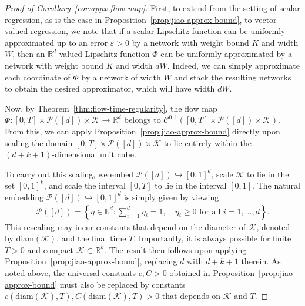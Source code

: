 \documentclass[10pt,a4paper]{amsart}
\newcommand{\R}{\mathbb{R}}
\newcommand{\calC}{{\mathcal C}}
\newcommand{\calK}{{\mathcal K}}
\newcommand{\calP}{{\mathcal P}}
\begin{document}
\begin{proof}[Proof of Corollary~\ref{cor:appx-flow-map}]
First, to extend from the setting of scalar regression, as is the case in Proposition~\ref{prop:jiao-approx-bound}, to vector-valued regression, we note that if a scalar Lipschitz function can be uniformly approximated up to an error $\varepsilon > 0$ by a network with weight bound $K$ and width $W$, then an $\R^d$ valued Lipschitz function $\Phi$ can be uniformly approximated by a network with weight bound $K$ and width $d W$. Indeed, we can simply approximate each coordinate of $\Phi$ by a network of width $W$ and stack the resulting networks to obtain the desired approximator, which will have width $d W$.

Now, by Theorem~\ref{thm:flow-time-regularity}, the flow map $\Phi : [0, T] \times \calP([d]) \times \calK \to \R^d$ belongs to $\calC^{0,1}([0, T] \times \calP([d])\times \calK)$. From this, we can apply Proposition~\ref{prop:jiao-approx-bound} directly upon scaling the domain $[0, T] \times \calP([d])\times \calK$ to lie entirely within the $(d + k +1)$-dimensional unit cube.

To carry out this scaling, we embed $\calP([d]) \hookrightarrow [0, 1]^d$, scale $\calK$ to lie in the set $[0,1]^k$, and scale the interval $[0, T]$ to lie in the interval $[0, 1]$. The natural embedding $\calP([d]) \hookrightarrow [0, 1]^d$ is simply given by viewing
\begin{align*}
    \calP([d]) = \left\{\eta \in \R^d : \sum_{i=1}^d \eta_i = 1, \quad \eta_i \geq 0 \text{ for all } i = 1, \ldots, d\right\}.
\end{align*}
This rescaling may incur constants that depend on the diameter of $\calK$, denoted by $\mathrm{diam}(\calK)$, and the final time $T$. Importantly, it is always possible for finite $T > 0$ and compact $\calK \subset \R^k$. The result then follows upon applying Proposition~\ref{prop:jiao-approx-bound}, replacing $d$ with $d + k + 1$ therein. As noted above, the universal constants $c, C > 0$ obtained in Proposition~\ref{prop:jiao-approx-bound} must also be replaced by constants $c(\mathrm{diam}(\calK), T), C(\mathrm{diam}(\calK), T) > 0$ that depends on $\calK$ and $T$.
\end{proof}
\end{document}
